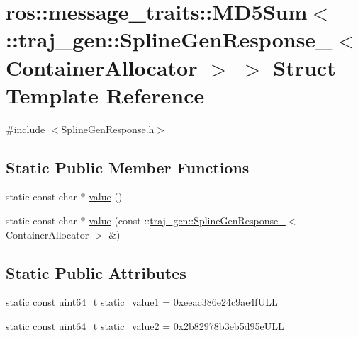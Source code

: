 \hypertarget{structros_1_1message__traits_1_1_m_d5_sum_3_01_1_1traj__gen_1_1_spline_gen_response___3_01_container_allocator_01_4_01_4}{}\section{ros\+:\+:message\+\_\+traits\+:\+:M\+D5\+Sum$<$ \+:\+:traj\+\_\+gen\+:\+:Spline\+Gen\+Response\+\_\+$<$ Container\+Allocator $>$ $>$ Struct Template Reference}
\label{structros_1_1message__traits_1_1_m_d5_sum_3_01_1_1traj__gen_1_1_spline_gen_response___3_01_container_allocator_01_4_01_4}


{\ttfamily \#include $<$Spline\+Gen\+Response.\+h$>$}

\subsection*{Static Public Member Functions}
\begin{DoxyCompactItemize}
\item 
static const char $\ast$ \hyperlink{structros_1_1message__traits_1_1_m_d5_sum_3_01_1_1traj__gen_1_1_spline_gen_response___3_01_container_allocator_01_4_01_4_ae7aac9c8a2d7855872120acf5266a68f}{value} ()
\item 
static const char $\ast$ \hyperlink{structros_1_1message__traits_1_1_m_d5_sum_3_01_1_1traj__gen_1_1_spline_gen_response___3_01_container_allocator_01_4_01_4_a8f5fb8b4c364ef6077fcd9fe71f8989d}{value} (const \+::\hyperlink{structtraj__gen_1_1_spline_gen_response__}{traj\+\_\+gen\+::\+Spline\+Gen\+Response\+\_\+}$<$ Container\+Allocator $>$ \&)
\end{DoxyCompactItemize}
\subsection*{Static Public Attributes}
\begin{DoxyCompactItemize}
\item 
static const uint64\+\_\+t \hyperlink{structros_1_1message__traits_1_1_m_d5_sum_3_01_1_1traj__gen_1_1_spline_gen_response___3_01_container_allocator_01_4_01_4_aa69be38c0336c19665130efd88f9f02e}{static\+\_\+value1} = 0xeeac386e24c9ae4f\+U\+LL
\item 
static const uint64\+\_\+t \hyperlink{structros_1_1message__traits_1_1_m_d5_sum_3_01_1_1traj__gen_1_1_spline_gen_response___3_01_container_allocator_01_4_01_4_ace08c59898c3be7f735201515ce27e7c}{static\+\_\+value2} = 0x2b82978b3eb5d95e\+U\+LL
\end{DoxyCompactItemize}


